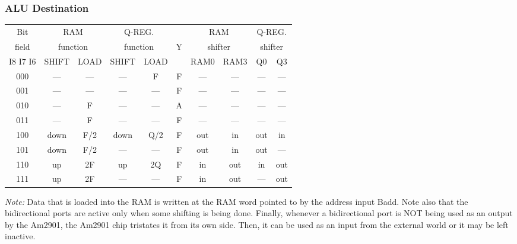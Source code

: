 \subsubsection{ALU Destination}
\begin{center}
\begin{tabular}{|c|c|c|c|c|c|c|c|c|c|} \hline
    Bit   & \multicolumn{2}{c|}{RAM} & \multicolumn{2}{c|}{Q-REG.}    &        &    \multicolumn{2}{c|}{RAM}     &  \multicolumn{2}{c|}{Q-REG.} \\
   field  & \multicolumn{2}{c|}{function}  &  \multicolumn{2}{c|}{function}   &   Y    &  \multicolumn{2}{c|}{shifter}   & \multicolumn{2}{c|}{shifter} \\ \hline
 I8 I7 I6 & SHIFT & LOAD & SHIFT & LOAD &        &RAM0 & RAM3 & Q0 & Q3 \\ \hline
   000    &  ---  & ---  & ---   &   F  &    F   & --- & ---  &--- &--- \\ \hline
   001    &  ---  & ---  &  ---  & ---  &    F   & --- & ---  &--- &--- \\ \hline
   010    & ---   &  F   &  ---  & ---  &    A   & --- & ---  &--- &--- \\ \hline
   011    & ---   &  F   &  ---  & ---  &    F   & --- & ---  &--- &--- \\ \hline
   100    & down  &  F/2 & down  &  Q/2 &    F   & out &  in  &out & in \\ \hline
   101    & down  &  F/2 &  ---  & ---  &    F   & out &  in  &out &--- \\ \hline
   110    &  up   &  2F  &  up   &  2Q  &    F   &  in & out  & in &out \\ \hline
   111    &  up   &  2F  &  ---  & ---  &    F   &  in & out  &--- &out \\ \hline
\end{tabular}
\end{center}


{\em Note:}  Data that is loaded into the RAM is written at the RAM word pointed
to by the address input Badd.
Note also that the bidirectional ports are active only when some 
shifting is being done. 
Finally, whenever a bidirectional port is NOT being used as an output by
the Am2901, the Am2901 chip tristates it from its own side. Then, 
it can be used as an input from the external world or it may be 
left inactive. 
